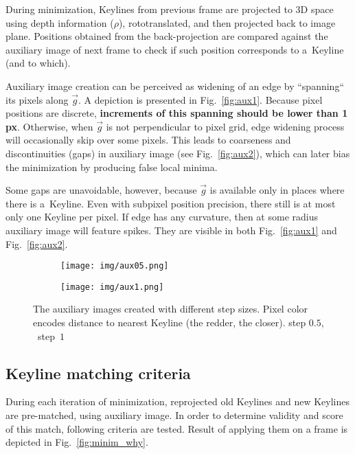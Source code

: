 During minimization, Keylines from previous frame are projected to 3D space using depth information ($\rho$), rototranslated, and then projected back to image plane. Positions obtained from the back-projection are compared against the auxiliary image of next frame to check if such position corresponds to a~Keyline (and to which).

Auxiliary image creation can be perceived as widening of an edge by ``spanning`` its pixels along $\vec{g}$. A depiction is presented in Fig.~\ref{fig:aux1}. Because pixel positions are discrete, \textbf{increments of this spanning should be lower than 1 px}. Otherwise, when $\vec{g}$ is not perpendicular to pixel grid, edge widening process will occasionally skip over some pixels. This leads to coarseness and discontinuities (gaps) in auxiliary image (see Fig.~\ref{fig:aux2}), which can later bias the minimization by producing false local minima.

Some gaps are unavoidable, however, because $\vec{g}$ is available only in places where there is a~Keyline. Even with subpixel position precision, there still is at most only one Keyline per pixel. If edge has any curvature, then at some radius auxiliary image will feature spikes. They are visible in both Fig.~\ref{fig:aux1} and Fig.~\ref{fig:aux2}.

\begin{figure}[ht]
	\centering
	\begin{subfigure}{0.49\textwidth}
		\centering\texttt{[image: img/aux05.png]}
		\subcaption{\label{fig:aux1}}
	\end{subfigure}
	\begin{subfigure}{0.49\textwidth}
		\centering\texttt{[image: img/aux1.png]}
		\subcaption{\label{fig:aux2}}
	\end{subfigure}
	\caption{\label{fig:aux}The auxiliary images created with different step sizes. Pixel color encodes distance to nearest Keyline (the redder, the closer). \protect{} step $0.5$,
		\protect{}~step~$1$}
\end{figure}



\subsection{Keyline matching criteria}
\label{sec:minim_match}

During each iteration of minimization, reprojected old Keylines and new Keylines are pre-matched, using auxiliary image. In order to determine validity and score of this match, following criteria are tested. Result of applying them on a frame is depicted in Fig.~\ref{fig:minim_why}.

